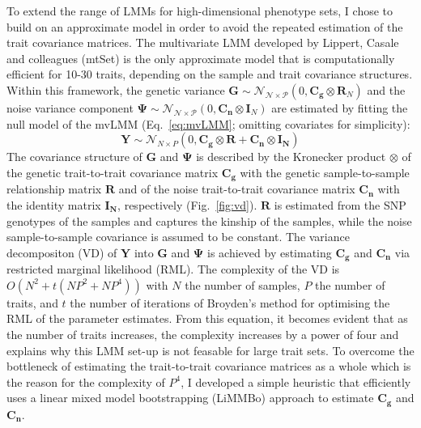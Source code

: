 To extend the range of LMMs for high-dimensional phenotype sets, I chose to build on an approximate model in order to avoid the repeated estimation of the trait covariance matrices. The multivariate LMM developed by Lippert, Casale and colleagues (mtSet) \citeyear{Lippert2014,Casale2015} is the only approximate model that is computationally efficient for 10-30 traits, depending on the sample and trait covariance structures. Within this framework, the genetic variance \(\mathbf{G} \sim\mathcal{N_{N\times P}}\left(0, \mathbf{C_g} \otimes \mathbf{R}_N\right)\) and the noise variance component \(\mathbf{\Psi} \sim\mathcal{N_{N\times P}}\left(0, \mathbf{C_n} \otimes \mathbf{I}_N\right)\) are estimated by fitting the null model of the mvLMM (Eq.~\ref{eq:mvLMM}; omitting covariates for simplicity):
\begin{equation}
\mathbf{Y} \sim \mathcal{N }_{N\times P}\left(0, \mathbf{C_g} \otimes \mathbf{R} + \mathbf{C_n} \otimes \mathbf{I_N}\right)
\label{eq:vd}
\end{equation}
The covariance structure of \(\mathbf{G}\) and \(\mathbf{\Psi}\) is described by the Kronecker product $\otimes$ of the genetic trait-to-trait covariance matrix $\mathbf{C_g}$ with the genetic sample-to-sample relationship matrix $\mathbf{R}$ and of the noise trait-to-trait covariance matrix $\mathbf{C_n}$ with the identity matrix $\mathbf{I_N}$, respectively (Fig.~\ref{fig:vd}).  $\mathbf{R}$ is estimated from the SNP genotypes of the samples and captures the kinship of the samples, while the noise sample-to-sample covariance is assumed to be constant. The variance decompositon (VD) of $\mathbf{Y}$ into $\mathbf{G}$ and $\mathbf{\Psi}$ is achieved by estimating \(\mathbf{C_g}\) and \(\mathbf{C_n}\) via restricted marginal likelihood (RML). The complexity of the VD is \(O(N^2 + t(NP^2 + NP^4))\) with \(N\) the number of samples, \(P\) the number of traits, and \(t\) the number of iterations of Broyden's method for optimising the RML of the parameter estimates. From this equation, it becomes evident that as the number of traits increases, the complexity increases by a power of four and explains why this LMM set-up is not feasable for large trait sets. To overcome the bottleneck of estimating the trait-to-trait covariance matrices as a whole which is the reason for the complexity of \(P^4\), I developed a simple heuristic that efficiently uses a linear mixed model bootstrapping (LiMMBo) approach to estimate \(\mathbf{C_g}\) and \(\mathbf{C_n}\).

